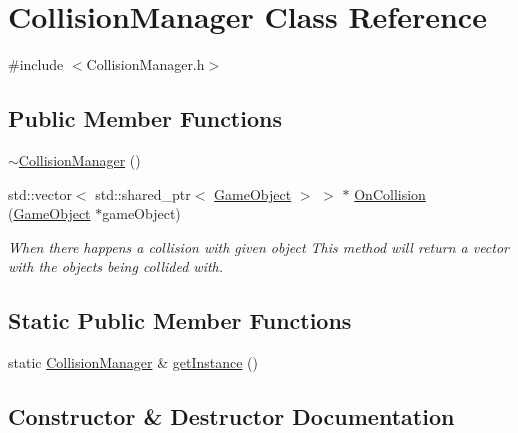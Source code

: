 \hypertarget{class_collision_manager}{}\section{Collision\+Manager Class Reference}
\label{class_collision_manager}


{\ttfamily \#include $<$Collision\+Manager.\+h$>$}

\subsection*{Public Member Functions}
\begin{DoxyCompactItemize}
\item 
\mbox{\hyperlink{class_collision_manager_acdbb3c842f0ef1c7a028d3f080855766}{$\sim$\+Collision\+Manager}} ()
\item 
std\+::vector$<$ std\+::shared\+\_\+ptr$<$ \mbox{\hyperlink{class_game_object}{Game\+Object}} $>$ $>$ $\ast$ \mbox{\hyperlink{class_collision_manager_a216d5bbe08e18a3a2aaa46a566b61c94}{On\+Collision}} (\mbox{\hyperlink{class_game_object}{Game\+Object}} $\ast$game\+Object)
\begin{DoxyCompactList}\small\item\em When there happens a collision with given object This method will return a vector with the objects being collided with. \end{DoxyCompactList}\end{DoxyCompactItemize}
\subsection*{Static Public Member Functions}
\begin{DoxyCompactItemize}
\item 
static \mbox{\hyperlink{class_collision_manager}{Collision\+Manager}} \& \mbox{\hyperlink{class_collision_manager_af7ae5c9cd14ffea044059e17225d3d1c}{get\+Instance}} ()
\end{DoxyCompactItemize}


\subsection{Constructor \& Destructor Documentation}
\mbox{\label{class_collision_manager_acdbb3c842f0ef1c7a028d3f080855766}} 
